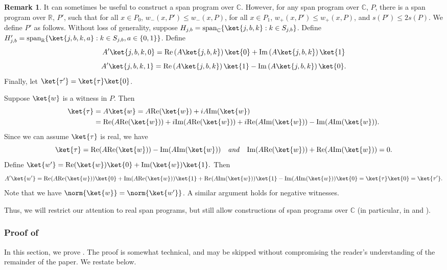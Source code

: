 \documentclass[11pt]{article}
\numberwithin{equation}{section}
\theoremstyle{definition}
\newtheorem{remark}[theorem]{Remark}
\theoremstyle{plain}
\newcommand{\C}{\mathbb C}
\newcommand{\R}{\mathbb R}
\begin{document}
\begin{remark}\label{rem:real}
It can sometimes be useful to construct a span program over $\C$. 
However, for any span program over $\C$, $P$, there is a span program over $\R$, $P'$, such that for all $x\in P_0$, $w_-(x,P')\leq w_-(x,P)$, for all $x\in P_1$, $w_+(x,P')\leq w_+(x,P)$, and $s(P')\leq 2s(P)$. We define $P'$ as follows. Without loss of generality, suppose $H_{j,b}=\mathrm{span}_{\C}\{\ket{j,b,k}:k\in S_{j,b}\}$. Define $H'_{j,b}=\mathrm{span}_{\R}\{\ket{j,b,k,a}:k\in S_{j,b},a\in\{0,1\}\}$. Define
$$A'\ket{j,b,k,0} = \mathrm{Re}\left(A\ket{j,b,k}\right)\ket{0}+\mathrm{Im}\left(A\ket{j,b,k}\right)\ket{1}$$
$$A'\ket{j,b,k,1} = \mathrm{Re}\left(A\ket{j,b,k}\right)\ket{1} - \mathrm{Im}\left(A\ket{j,b,k}\right)\ket{0}.$$
Finally, let $\ket{\tau'}=\ket{\tau}\ket{0}$. 

Suppose $\ket{w}$ is a witness in $P$. Then
\begin{align*}
\ket{\tau} &= A\ket{w}=A\mathrm{Re}(\ket{w})+iA\mathrm{Im}(\ket{w})\\ 
&= \mathrm{Re}(A\mathrm{Re}(\ket{w}))+i\mathrm{Im}(A\mathrm{Re}(\ket{w}))+i\mathrm{Re}(A\mathrm{Im}(\ket{w})) - \mathrm{Im}(A\mathrm{Im}(\ket{w})).
\end{align*}
Since we can assume $\ket{\tau}$ is real, we have
$$\ket{\tau}=\mathrm{Re}(A\mathrm{Re}(\ket{w})) - \mathrm{Im}(A\mathrm{Im}(\ket{w}))\quad\mbox{\emph{and}}\quad
\mathrm{Im}(A\mathrm{Re}(\ket{w}))+\mathrm{Re}(A\mathrm{Im}(\ket{w})) = 0.$$
Define
$\ket{w'} = \mathrm{Re}(\ket{w})\ket{0}+\mathrm{Im}(\ket{w})\ket{1}.$
Then
$$A'\ket{w'} = \mathrm{Re}(A\mathrm{Re}(\ket{w}))\ket{0}+\mathrm{Im}(A\mathrm{Re}(\ket{w}))\ket{1} + \mathrm{Re}(A\mathrm{Im}(\ket{w}))\ket{1} - \mathrm{Im}(A\mathrm{Im}(\ket{w}))\ket{0}=\ket{\tau}\ket{0}=\ket{\tau'}.$$
Note that we have $\norm{\ket{w}}=\norm{\ket{w'}}$. 
A similar argument holds for negative witnesses. 

Thus, we will restrict our attention to real span programs, but still allow constructions of span programs over $\C$ (in particular, in  and ).
\end{remark}

%

\subsubsection{Proof of }\label{sec:kappa}

%
%
In this section, we prove . The proof is somewhat technical, and may be skipped without compromising the reader's understanding of the remainder of the paper. We restate  below. %
\end{document}
